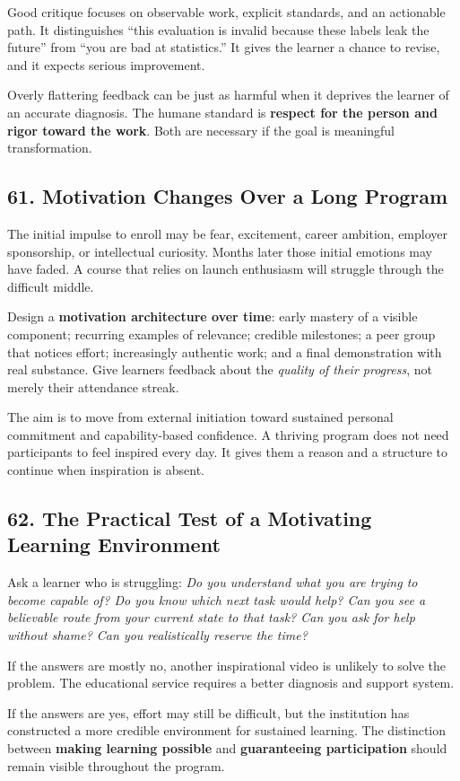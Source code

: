 Good critique focuses on observable work, explicit standards, and an actionable path. It distinguishes ``this evaluation is invalid because these labels leak the future'' from ``you are bad at statistics.'' It gives the learner a chance to revise, and it expects serious improvement.

Overly flattering feedback can be just as harmful when it deprives the learner of an accurate diagnosis. The humane standard is \textbf{respect for the person and rigor toward the work}. Both are necessary if the goal is meaningful transformation.

\subsection*{61. Motivation Changes Over a Long Program}

The initial impulse to enroll may be fear, excitement, career ambition, employer sponsorship, or intellectual curiosity. Months later those initial emotions may have faded. A course that relies on launch enthusiasm will struggle through the difficult middle.

Design a \textbf{motivation architecture over time}: early mastery of a visible component; recurring examples of relevance; credible milestones; a peer group that notices effort; increasingly authentic work; and a final demonstration with real substance. Give learners feedback about the \emph{quality of their progress}, not merely their attendance streak.

The aim is to move from external initiation toward sustained personal commitment and capability-based confidence. A thriving program does not need participants to feel inspired every day. It gives them a reason and a structure to continue when inspiration is absent.

\subsection*{62. The Practical Test of a Motivating Learning Environment}

Ask a learner who is struggling: \emph{Do you understand what you are trying to become capable of? Do you know which next task would help? Can you see a believable route from your current state to that task? Can you ask for help without shame? Can you realistically reserve the time?}

If the answers are mostly no, another inspirational video is unlikely to solve the problem. The educational service requires a better diagnosis and support system.

If the answers are yes, effort may still be difficult, but the institution has constructed a more credible environment for sustained learning. The distinction between \textbf{making learning possible} and \textbf{guaranteeing participation} should remain visible throughout the program.
